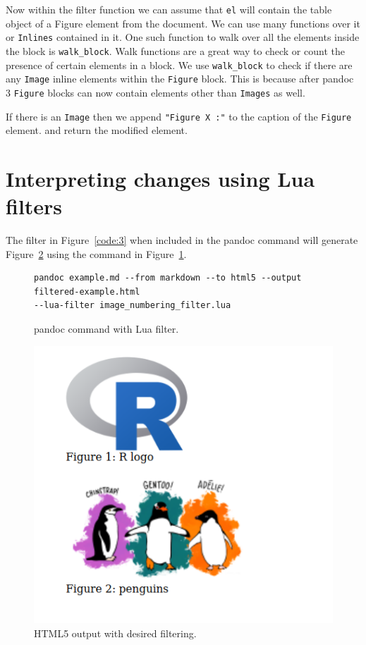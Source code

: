 Now within the filter function we can assume that \verb|el| will contain the table object of a Figure element from the document. We can use many functions over it or \verb|Inlines| contained in it. One such function to walk over all the elements inside the block is \verb|walk_block|. Walk functions are a great way to check or count the presence of certain elements in a block. We use \verb|walk_block| to check if there are any \verb|Image| inline elements within the \verb|Figure| block. This is because after pandoc 3 \citep{pandoc} \verb|Figure| blocks can now contain elements other than \verb|Images| as well.

If there is an \verb|Image| then we append \verb|"Figure X :"| to the caption of the \verb|Figure| element.
and return the modified element.

\section{Interpreting changes using Lua filters}

The filter in Figure~\ref{code:3} when included in the pandoc command will generate Figure~\ref{fig:2} 
using the command in Figure~\ref{code:4}.

\begin{figure}[htbp]
\begin{verbatim}
pandoc example.md --from markdown --to html5 --output filtered-example.html
--lua-filter image_numbering_filter.lua
\end{verbatim}
\caption{pandoc command with Lua filter.}
\label{code:4}
\end{figure}

\begin{figure}[htbp]
\centering
\includegraphics[width=0.5\linewidth]{figures/example-filtered.png}
\caption{HTML5 output with desired filtering.}
\label{fig:2}
\end{figure}

